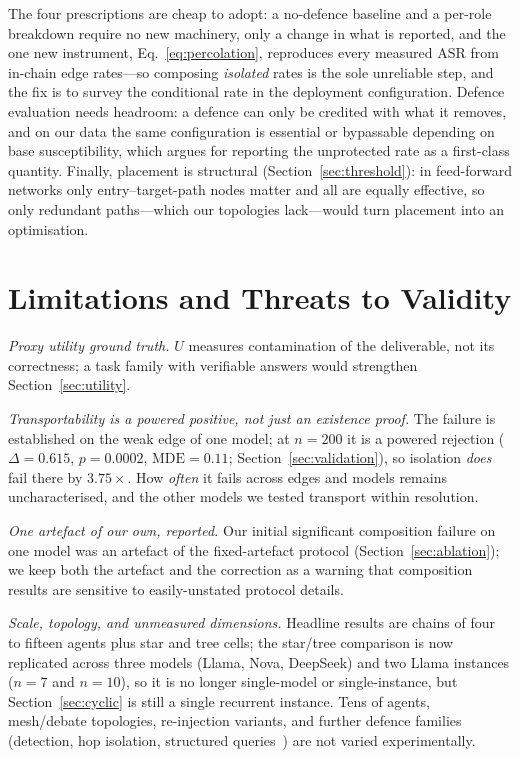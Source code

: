 \documentclass[sigconf,anonymous]{aamas}
\begin{document}
The four prescriptions are cheap to adopt: a no-defence baseline and a per-role
breakdown require no new machinery, only a change in what is reported, and the one
new instrument, Eq.~\eqref{eq:percolation}, reproduces every measured ASR from
in-chain edge rates---so composing \emph{isolated} rates is the sole unreliable step,
and the fix is to survey the conditional rate in the deployment configuration.
Defence evaluation needs headroom: a defence can only be credited with what it
removes, and on our data the same configuration is essential or bypassable depending
on base susceptibility, which argues for reporting the unprotected rate as a
first-class quantity. Finally, placement is structural
(Section~\ref{sec:threshold}): in feed-forward networks only entry--target-path nodes
matter and all are equally effective, so only redundant paths---which our topologies
lack---would turn placement into an optimisation.


\section{Limitations and Threats to Validity}
\label{sec:limits}

\emph{Proxy utility ground truth.} $U$ measures contamination of the deliverable,
not its correctness; a task family with verifiable answers would strengthen
Section~\ref{sec:utility}.

\emph{Transportability is a powered positive, not just an existence proof.} The
failure is established on the weak edge of one model; at $n = 200$ it is a powered
rejection ($\Delta = 0.615$, $p = 0.0002$, $\mathrm{MDE} = 0.11$;
Section~\ref{sec:validation}), so isolation \emph{does} fail there by $3.75\times$.
How \emph{often} it fails across edges and models remains uncharacterised, and the
other models we tested transport within resolution.

\emph{One artefact of our own, reported.} Our initial significant composition failure
on one model was an artefact of the fixed-artefact protocol
(Section~\ref{sec:ablation}); we keep both the artefact and the correction as a
warning that composition results are sensitive to easily-unstated protocol details.

\emph{Scale, topology, and unmeasured dimensions.} Headline results are chains of
four to fifteen agents plus star and tree cells; the star/tree comparison is now
replicated across three models (Llama, Nova, DeepSeek) and two Llama instances
($n = 7$ and $n = 10$), so it is no longer single-model or single-instance, but
Section~\ref{sec:cyclic} is still a single recurrent instance. Tens of agents,
mesh/debate topologies, re-injection variants, and further defence families
(detection, hop isolation, structured queries~\cite{StrUQ2025}) are not varied
experimentally.
\end{document}
